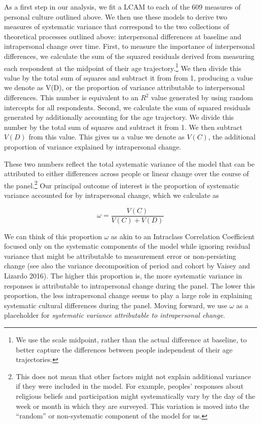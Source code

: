 \documentclass[
  12pt,
]{article}
\begin{document}
As a first step in our analysis, we fit a LCAM to each of the 609
measures of personal culture outlined above. We then use these models to
derive two measures of systematic variance that correspond to the two
collections of theoretical processes outlined above: interpersonal
differences at baseline and intrapersonal change over time. First, to
measure the importance of interpersonal differences, we calculate the
sum of the squared residuals derived from measuring each respondent at
the midpoint of their age trajectory.\footnote{We use the scale
  midpoint, rather than the actual difference at baseline, to better
  capture the differences between people independent of their age
  trajectories.} We then divide this value by the total sum of squares
and subtract it from from 1, producing a value we denote as V(D), or the
proportion of variance attributable to interpersonal differences. This
number is equivalent to an \(R^2\) value generated by using random
intercepts for all respondents. Second, we calculate the sum of squared
residuals generated by additionally accounting for the age trajectory.
We divide this number by the total sum of squares and subtract it from
1. We then subtract \(V(D)\) from this value. This gives us a value we
denote as \(V(C)\), the additional proportion of variance explained by
intrapersonal change.

These two numbers reflect the total systematic variance of the model
that can be attributed to either differences across people or linear
change over the course of the panel.\footnote{This does not mean that
  other factors might not explain additional variance if they were
  included in the model. For example, peoples' responses about religious
  beliefs and participation might systematically vary by the day of the
  week or month in which they are surveyed. This variation is moved into
  the ``random'' or non-systematic component of the model for us.} Our
principal outcome of interest is the proportion of systematic variance
accounted for by intrapersonal change, which we calculate as

\[
\omega = \frac{V(C)}{V(C) + V(D)}
\]

We can think of this proportion \(\omega\) as akin to an Intraclass
Correlation Coefficient focused only on the systematic components of the
model while ignoring residual variance that might be attributable to
measurement error or non-persisting change (see also the variance
decomposition of period and cohort by Vaisey and Lizardo 2016). The
higher this proportion is, the more systematic variance in responses is
attributable to intrapersonal change during the panel. The lower this
proportion, the less intrapersonal change seems to play a large role in
explaining systematic cultural differences during the panel. Moving
forward, we use \(\omega\) as a placeholder for \emph{systematic
variance attributable to intrapersonal change}.
\end{document}
